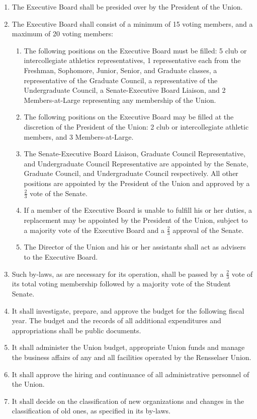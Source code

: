 \documentclass[12pt]{constitution}
\begin{document}
\begin{enumerate}
\item The Executive Board shall be presided over by the President of the Union.
\item The Executive Board shall consist of a minimum of 15 voting members, and a maximum of 20
voting members:
\begin{enumerate}
\item The following positions on the Executive Board must be filled: 5 club or intercollegiate athletics representatives, 1 representative each from the Freshman, Sophomore, Junior, Senior, and Graduate classes, a representative of the Graduate Council, a representative of the Undergraduate Council, a Senate-Executive Board Liaison, and 2 Members-at-Large representing any membership of the Union.
\item The following positions on the Executive Board may be filled at the discretion of the President of the Union: 2 club or intercollegiate athletic members, and 3 Members-at-Large.
\item The Senate-Executive Board Liaison, Graduate Council Representative, and Undergraduate Council Representative are appointed by the Senate, Graduate Council, and Undergraduate Council respectively. All other positions are appointed by the President of the Union and approved by a $\frac{2}{3}$ vote of the Senate.
\item If a member of the Executive Board is unable to fulfill his or her duties, a replacement may be appointed by the President of the Union, subject to a majority vote of the Executive Board and a $\frac{2}{3}$ approval of the Senate.
\item The Director of the Union and his or her assistants shall act as advisers to the Executive Board.
\end{enumerate}


\item Such by-laws, as are necessary for its operation, shall be passed by a $\frac{2}{3}$ vote of its total voting
membership followed by a majority vote of the Student Senate.
\item It shall investigate, prepare, and approve the budget for the following fiscal year. The budget
and the records of all additional expenditures and appropriations shall be public documents. 
\item It shall administer the Union budget, appropriate Union funds and manage the business affairs
of any and all facilities operated by the Rensselaer Union.
\item It shall approve the hiring and continuance of all administrative personnel of the Union.
\item It shall decide on the classification of new organizations and changes in the classification of old
ones, as specified in its by-laws.
\end{enumerate}
\end{document}
